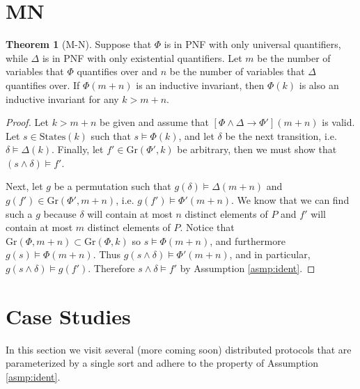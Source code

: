 \documentclass[12pt]{article}
\theoremstyle{definition}
\newtheorem{theorem}{Theorem}
\theoremstyle{remark}
\newcommand{\states}{\text{States}}
\newcommand{\gr}{\text{Gr}}
\begin{document}
\section{MN}
\begin{theorem}[M-N]
  Suppose that $\Phi$ is in PNF with only universal quantifiers, while $\Delta$ is in PNF with only existential quantifiers.  Let $m$ be the number of variables that $\Phi$ quantifies over and $n$ be the number of variables that $\Delta$ quantifies over.  If $\Phi(m+n)$ is an inductive invariant, then $\Phi(k)$ is also an inductive invariant for any $k>m+n$.
\end{theorem}
\begin{proof}
  Let $k>m+n$ be given and assume that $[\Phi\land\Delta \rightarrow \Phi'](m+n)$ is valid.  Let $s \in \states(k)$ such that $s \models \Phi(k)$, and let $\delta$ be the next transition, i.e. $\delta \models \Delta(k)$.  Finally, let $f' \in \gr(\Phi',k)$ be arbitrary, then we must show that $(s \land \delta) \models f'$.

  Next, let $g$ be a permutation such that $g(\delta) \models \Delta(m+n)$ and $g(f') \in \gr(\Phi',m+n)$, i.e. $g(f') \models \Phi'(m+n)$.  We know that we can find such a $g$ because $\delta$ will contain at most $n$ distinct elements of $P$ and $f'$ will contain at most $m$ distinct elements of $P$.  Notice that $\gr(\Phi,m+n) \subset \gr(\Phi,k)$ so $s \models \Phi(m+n)$, and furthermore $g(s) \models \Phi(m+n)$.  Thus $g(s \land \delta) \models \Phi'(m+n)$, and in particular, $g(s \land \delta) \models g(f')$.  Therefore $s \land \delta \models f'$ by Assumption \ref{asmp:ident}.
\end{proof}



\section{Case Studies}
In this section we visit several (more coming soon) distributed protocols that are parameterized by a single sort and adhere to the property of Assumption \ref{asmp:ident}.
\end{document}
